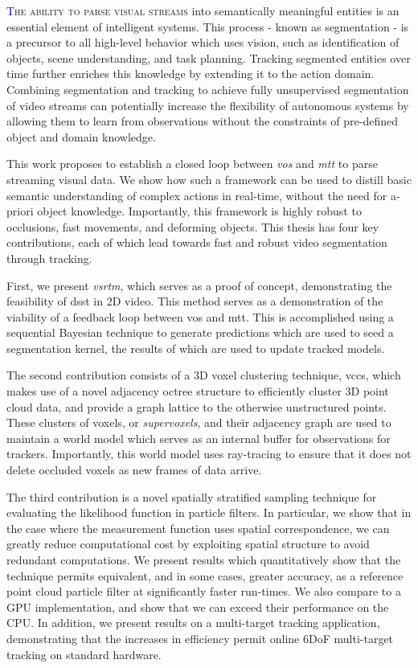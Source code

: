 \lettrine[lines=2, loversize=0.3]{\textcolor{DarkBlue}T}{he ability to parse visual streams} into semantically meaningful entities is an essential element of intelligent systems. This process - known as segmentation - is a precursor to all high-level behavior which uses vision, such as identification of objects, scene understanding, and task planning. Tracking segmented entities over time further enriches this knowledge by extending it to the action domain. Combining segmentation and tracking to achieve fully unsupervised segmentation of video streams can potentially increase the flexibility of autonomous systems by allowing them to learn from observations without the constraints of pre-defined object and domain knowledge.

This work proposes to establish a closed loop between \emph{\gls{vos}} and \emph{\gls{mtt}} to parse streaming visual data. We show how such a framework can be used to distill basic semantic understanding of complex actions in real-time, without the need for a-priori object knowledge. Importantly, this framework is highly robust to occlusions, fast movements, and deforming objects. This thesis has four key contributions, each of which lead towards fast and robust video segmentation through tracking.

First, we present \emph{\gls{vsrtm}}, which serves as a proof of concept, demonstrating the feasibility of \gls{dsst} in 2D video. This method serves as a demonstration of the viability of a feedback loop between \gls{vos} and \gls{mtt}. This is accomplished using a sequential Bayesian technique to generate predictions which are used to seed a segmentation kernel, the results of which are used to update tracked models. 

The second contribution consists of a 3D voxel clustering technique, \gls{vccs}, which makes use of a novel adjacency octree structure to efficiently cluster 3D point cloud data, and provide a graph lattice to the otherwise unstructured points. These clusters of voxels, or \emph{supervoxels}, and their adjacency graph are used to maintain a world model which serves as an internal buffer for observations for trackers. Importantly, this world model uses ray-tracing to ensure that it does not delete occluded voxels as new frames of data arrive.

The third contribution is a novel spatially stratified sampling technique for evaluating the likelihood function in particle filters. In particular, we show that in the case where the measurement function uses spatial correspondence, we can greatly reduce computational cost by exploiting spatial structure to avoid redundant computations. We present results which quantitatively show that the technique permits equivalent, and in some cases, greater accuracy, as a reference point cloud particle filter at significantly faster run-times. We also compare to a GPU implementation, and show that we can exceed their performance on the CPU. In addition, we present results on a multi-target tracking application, demonstrating that the increases in efficiency permit online 6DoF multi-target tracking on standard hardware.

